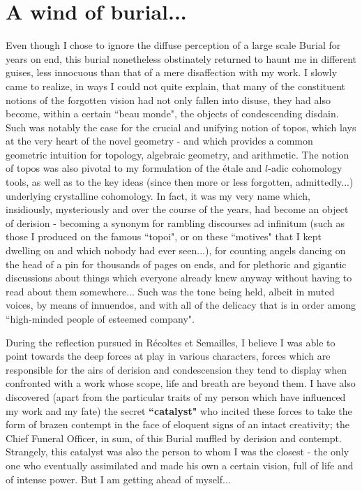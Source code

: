 \section{A wind of burial...}

Even though I chose to ignore the diffuse perception of a large scale Burial for years on end, this burial nonetheless obstinately returned to haunt me in different guises, less innocuous than that of a mere  disaffection with my work. I slowly came to realize, in ways I could not quite explain, that many of the constituent notions of the forgotten vision had not only fallen into disuse, they had also become, within a certain ``beau monde", the objects of condescending disdain. Such was notably the case for the crucial and unifying notion of topos, which lays at the very heart of the novel geometry - and which provides a common geometric intuition for topology, algebraic geometry, and arithmetic. The notion of topos was also pivotal to my formulation of the \'etale and $l$-adic cohomology tools, as well as to the key ideas (since then more or less forgotten, admittedly...) underlying crystalline cohomology. In fact, it was my very name which, insidiously, mysteriously and over the course of the years, had become an object of derision - becoming a synonym for rambling discourses ad infinitum (such as those I produced on the famous ``topoi", or on these ``motives" that I kept dwelling on and which nobody had ever seen...), for counting angels dancing on the head of a pin for thousands of pages on ends, and for plethoric and gigantic discussions about things which everyone already knew anyway without having to read about them somewhere...  Such was the tone being held, albeit in muted voices, by means of innuendos, and with all of the delicacy that is in order among ``high-minded people of esteemed company". 

During the reflection pursued in R\'ecoltes et Semailles, I believe I was able to point towards the deep forces at play in various characters, forces which are responsible for the airs of derision and condescension they tend to display when confronted with a work whose scope, life and breath are beyond them. I have also discovered (apart from the particular traits of my person which have influenced my work and my fate) the secret \textbf{``catalyst"} who incited these forces to take the form of brazen contempt in the face of eloquent signs of an intact creativity; the Chief Funeral Officer, in sum, of this Burial muffled by derision and contempt. Strangely, this catalyst was also the person to whom I was the closest - the only one who eventually assimilated and made his own a certain vision, full of life and of intense power. But I am getting ahead of myself...


